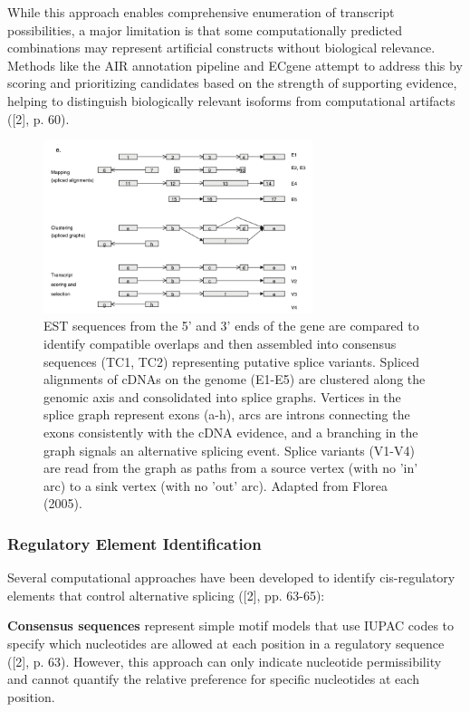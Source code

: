 \documentclass[12pt,a4paper]{article}
\begin{document}
While this approach enables comprehensive enumeration of transcript possibilities, a major limitation is that some computationally predicted combinations may represent artificial constructs without biological relevance. Methods like the AIR annotation pipeline and ECgene attempt to address this by scoring and prioritizing candidates based on the strength of supporting evidence, helping to distinguish biologically relevant isoforms from computational artifacts ([2], p. 60).

\begin{figure}[H]
\centering
\includegraphics[width=0.7\textwidth]{splice_graph_figure_2e_florea.png}
\caption{EST sequences from the 5' and 3' ends of the gene are compared to identify compatible overlaps and then assembled into consensus sequences (TC1, TC2) representing putative splice variants. Spliced alignments of cDNAs on the genome (E1-E5) are clustered along the genomic axis and consolidated into splice graphs. Vertices in the splice graph represent exons (a-h), arcs are introns connecting the exons consistently with the cDNA evidence, and a branching in the graph signals an alternative splicing event. Splice variants (V1-V4) are read from the graph as paths from a source vertex (with no 'in' arc) to a sink vertex (with no 'out' arc). Adapted from Florea (2005).}
\label{fig:splice_graph}
\end{figure}

\subsubsection{Regulatory Element Identification}

Several computational approaches have been developed to identify cis-regulatory elements that control alternative splicing ([2], pp. 63-65):

\textbf{Consensus sequences} represent simple motif models that use IUPAC codes to specify which nucleotides are allowed at each position in a regulatory sequence ([2], p. 63). However, this approach can only indicate nucleotide permissibility and cannot quantify the relative preference for specific nucleotides at each position.
\end{document}
